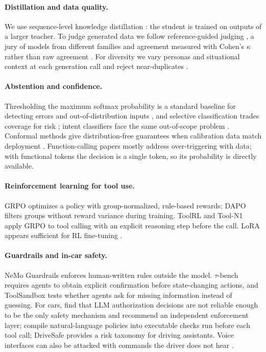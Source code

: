 \paragraph{Distillation and data quality.}
We use sequence-level knowledge distillation \citep{hinton2015distilling,kim2016sequence}: the student is trained on outputs
of a larger teacher. To judge generated data we follow reference-guided judging \citep{zheng2023judging}, a jury of models from
different families \citep{verga2024juries} and agreement measured with Cohen's $\kappa$ rather than raw agreement
\citep{thakur2025judging}. For diversity we vary personas \citep{ge2024persona} and situational context
\citep{xu2024wizardlm} at each generation call and reject near-duplicates \citep{wang2023selfinstruct}.

\paragraph{Abstention and confidence.}
Thresholding the maximum softmax probability is a standard baseline for detecting errors and out-of-distribution inputs
\citep{hendrycks2017baseline}, and selective classification trades coverage for risk \citep{geifman2017selective}; intent
classifiers face the same out-of-scope problem \citep{larson2019clinc}. Conformal methods give distribution-free guarantees
when calibration data match deployment \citep{angelopoulos2021conformal}. Function-calling papers mostly address
over-triggering with data; with functional tokens the decision is a single token, so its probability is directly available.

\paragraph{Reinforcement learning for tool use.}
GRPO \citep{shao2024deepseekmath} optimizes a policy with group-normalized, rule-based rewards; DAPO \citep{yu2025dapo} filters
groups without reward variance during training. ToolRL \citep{qian2025toolrl} and Tool-N1 \citep{zhang2025tooln1} apply GRPO to
tool calling with an explicit reasoning step before the call. LoRA \citep{hu2022lora} appears sufficient for RL fine-tuning
\citep{schulman2025lora}.

\paragraph{Guardrails and in-car safety.}
NeMo Guardrails \citep{rebedea2023nemo} enforces human-written rules outside the model. $\tau$-bench \citep{yao2024taubench}
requires agents to obtain explicit confirmation before state-changing actions, and ToolSandbox \citep{lu2024toolsandbox}
tests whether agents ask for missing information instead of guessing. For cars, \citet{afroze2026intent} find that LLM
authorization decisions are not reliable enough to be the only safety mechanism and recommend an independent enforcement
layer; \citet{bouchekir2026policies} compile natural-language policies into executable checks run before each tool call;
DriveSafe \citep{kumar2026drivesafe} provides a risk taxonomy for driving assistants. Voice interfaces can also be attacked
with commands the driver does not hear \citep{zhang2017dolphin}.

